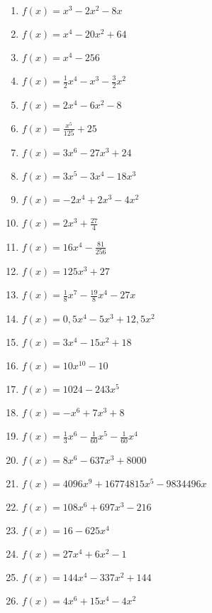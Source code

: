 \begin{Exercise}[title={Berechne die Nullstellen}, label=ganzNSTA1]
	
	\begin{minipage}{\textwidth}
		\begin{minipage}{0.5\textwidth}
			\begin{enumerate}[label=\alph*)]
				\item \(f(x)=x^3-2x^2-8x\)
				\item \(f(x)=x^4-20x^2+64\)
				\item \(f(x)=x^4-256\)
				\item \(f(x)=\frac{1}{2}x^4-x^3-\frac{3}{2}x^2\)
				\item \(f(x)=2x^4-6x^2-8\)
				\item \(f(x)=\frac{x^5}{125}+25\)
				\item \(f(x)=3x^6-27x^3+24\)
				\item \(f(x)=3x^5-3x^4-18x^3\)
				\item \(f(x)=-2x^4+2x^3-4x^2\)
				\item \(f(x)=2x^3+\frac{27}{4}\)
				\item \(f(x)=16x^4-\frac{81}{256}\)
				\item \(f(x)=125x^3+27\)
				\item \(f(x)=\frac{1}{8}x^7-\frac{19}{8}x^4-27x\)
			\end{enumerate}
		\end{minipage}%
		\begin{minipage}{0.5\textwidth}
			\begin{enumerate}[label=\alph*)]
				\setcounter{enumi}{13}
				\item \(f(x)=0,5x^4-5x^3+12,5x^2\)
				\item \(f(x)=3x^4-15x^2+18\)
				\item \(f(x)=10x^{10}-10\)
				\item \(f(x)=1024-243x^5\)
				\item \(f(x)=-x^6+7x^3+8\)
				\item \(f(x)=\frac{1}{3}x^6-\frac{1}{60}x^5-\frac{1}{60}x^4\)
				\item \(f(x)=8x^6-637x^3+8000\)
				\item \(f(x)=4096x^9+16774815x^5-9834496x\)
				\item \(f(x)=108x^6+697x^3-216\)
				\item \(f(x)=16-625x^4\)
				\item \(f(x)=27x^4+6x^2-1\)
				\item \(f(x)=144x^4-337x^2+144\)
				\item \(f(x)=4x^6+15x^4-4x^2\)
			\end{enumerate}
		\end{minipage}%
	\end{minipage}
\end{Exercise}
